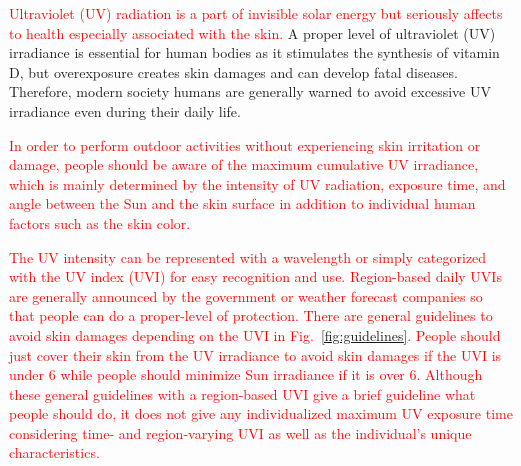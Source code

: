 \documentclass[journal]{IEEEtran}
\begin{document}
\textcolor{red}{Ultraviolet (UV) radiation is a part of invisible solar energy but seriously affects to health especially associated with the skin.}
A proper level of ultraviolet (UV) irradiance is essential for human bodies as it stimulates the synthesis of vitamin D, but overexposure creates skin damages and can develop fatal diseases. Therefore, modern society humans are generally warned to avoid excessive UV irradiance even during their daily life.

\textcolor{red}{In order to perform  outdoor activities without experiencing skin irritation or damage, people should be aware of the maximum cumulative UV irradiance, which is mainly determined by the intensity of UV radiation, exposure time, and angle between the Sun and the skin surface in addition to individual human factors such as the skin color.}%

\textcolor{red}{The UV intensity can be represented with a wavelength or simply categorized with the UV index (UVI) for easy recognition and use. Region-based daily UVIs are generally announced by the government or weather forecast companies so that people can do a proper-level of protection. There are general guidelines to avoid skin damages depending on the UVI in Fig.~\ref{fig:guidelines}. People should just cover their skin from the UV irradiance to avoid skin damages if the UVI is under 6 while people should minimize Sun irradiance if it is over 6. Although these general guidelines with a region-based UVI give a brief guideline what people should do, it does not give any individualized maximum UV exposure time considering time- and region-varying UVI as well as the individual's unique characteristics.}
\end{document}
